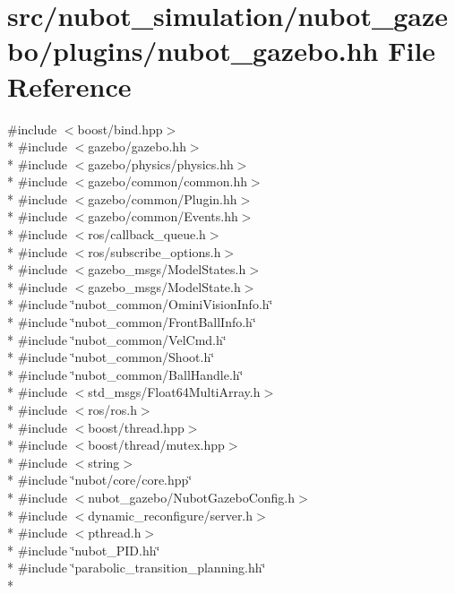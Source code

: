 \hypertarget{nubot__gazebo_8hh}{\section{src/nubot\-\_\-simulation/nubot\-\_\-gazebo/plugins/nubot\-\_\-gazebo.hh File Reference}
\label{nubot__gazebo_8hh}
}
{\ttfamily \#include $<$boost/bind.\-hpp$>$}\\*
{\ttfamily \#include $<$gazebo/gazebo.\-hh$>$}\\*
{\ttfamily \#include $<$gazebo/physics/physics.\-hh$>$}\\*
{\ttfamily \#include $<$gazebo/common/common.\-hh$>$}\\*
{\ttfamily \#include $<$gazebo/common/\-Plugin.\-hh$>$}\\*
{\ttfamily \#include $<$gazebo/common/\-Events.\-hh$>$}\\*
{\ttfamily \#include $<$ros/callback\-\_\-queue.\-h$>$}\\*
{\ttfamily \#include $<$ros/subscribe\-\_\-options.\-h$>$}\\*
{\ttfamily \#include $<$gazebo\-\_\-msgs/\-Model\-States.\-h$>$}\\*
{\ttfamily \#include $<$gazebo\-\_\-msgs/\-Model\-State.\-h$>$}\\*
{\ttfamily \#include \char`\"{}nubot\-\_\-common/\-Omini\-Vision\-Info.\-h\char`\"{}}\\*
{\ttfamily \#include \char`\"{}nubot\-\_\-common/\-Front\-Ball\-Info.\-h\char`\"{}}\\*
{\ttfamily \#include \char`\"{}nubot\-\_\-common/\-Vel\-Cmd.\-h\char`\"{}}\\*
{\ttfamily \#include \char`\"{}nubot\-\_\-common/\-Shoot.\-h\char`\"{}}\\*
{\ttfamily \#include \char`\"{}nubot\-\_\-common/\-Ball\-Handle.\-h\char`\"{}}\\*
{\ttfamily \#include $<$std\-\_\-msgs/\-Float64\-Multi\-Array.\-h$>$}\\*
{\ttfamily \#include $<$ros/ros.\-h$>$}\\*
{\ttfamily \#include $<$boost/thread.\-hpp$>$}\\*
{\ttfamily \#include $<$boost/thread/mutex.\-hpp$>$}\\*
{\ttfamily \#include $<$string$>$}\\*
{\ttfamily \#include \char`\"{}nubot/core/core.\-hpp\char`\"{}}\\*
{\ttfamily \#include $<$nubot\-\_\-gazebo/\-Nubot\-Gazebo\-Config.\-h$>$}\\*
{\ttfamily \#include $<$dynamic\-\_\-reconfigure/server.\-h$>$}\\*
{\ttfamily \#include $<$pthread.\-h$>$}\\*
{\ttfamily \#include \char`\"{}nubot\-\_\-\-P\-I\-D.\-hh\char`\"{}}\\*
{\ttfamily \#include \char`\"{}parabolic\-\_\-transition\-\_\-planning.\-hh\char`\"{}}\\*
